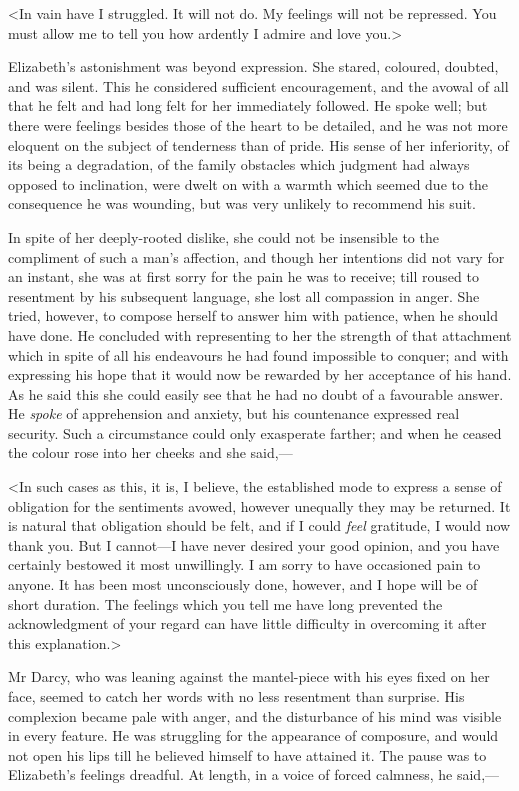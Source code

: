 <In vain have I struggled. It will not do. My feelings will not be repressed. You must allow me to tell you how ardently I admire and love you.>

Elizabeth's astonishment was beyond expression. She stared, coloured, doubted, and was silent. This he considered sufficient encouragement, and the avowal of all that he felt and had long felt for her immediately followed. He spoke well; but there were feelings besides those of the heart to be detailed, and he was not more eloquent on the subject of tenderness than of pride. His sense of her inferiority, of its being a degradation, of the family obstacles which judgment had always opposed to inclination, were dwelt on with a warmth which seemed due to the consequence he was wounding, but was very unlikely to recommend his suit.

In spite of her deeply-rooted dislike, she could not be insensible to the compliment of such a man's affection, and though her intentions did not vary for an instant, she was at first sorry for the pain he was to receive; till roused to resentment by his subsequent language, she lost all compassion in anger. She tried, however, to compose herself to answer him with patience, when he should have done. He concluded with representing to her the strength of that attachment which in spite of all his endeavours he had found impossible to conquer; and with expressing his hope that it would now be rewarded by her acceptance of his hand. As he said this she could easily see that he had no doubt of a favourable answer. He \textit{spoke} of apprehension and anxiety, but his countenance expressed real security. Such a circumstance could only exasperate farther; and when he ceased the colour rose into her cheeks and she said,—

<In such cases as this, it is, I believe, the established mode to express a sense of obligation for the sentiments avowed, however unequally they may be returned. It is natural that obligation should be felt, and if I could \textit{feel} gratitude, I would now thank you. But I cannot—I have never desired your good opinion, and you have certainly bestowed it most unwillingly. I am sorry to have occasioned pain to anyone. It has been most unconsciously done, however, and I hope will be of short duration. The feelings which you tell me have long prevented the acknowledgment of your regard can have little difficulty in overcoming it after this explanation.>

Mr Darcy, who was leaning against the mantel-piece with his eyes fixed on her face, seemed to catch her words with no less resentment than surprise. His complexion became pale with anger, and the disturbance of his mind was visible in every feature. He was struggling for the appearance of composure, and would not open his lips till he believed himself to have attained it. The pause was to Elizabeth's feelings dreadful. At length, in a voice of forced calmness, he said,—

